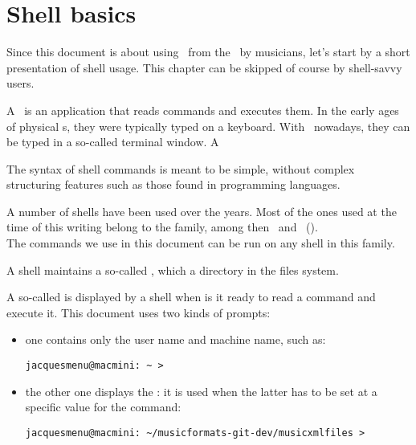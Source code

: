 
\chapter{Shell basics}

Since this document is about using \mf\ from the \CLI\ by musicians, let's start by a short presentation of shell usage. This chapter can be skipped of course by shell-savvy users.

A \shell\ is an application that reads commands and executes them. In the early ages of physical s, they were typically typed on a keyboard. With \GUI\ nowadays, they can be typed in a so-called terminal window.
A 

The syntax of shell commands is meant to be simple, without complex structuring features such as those found in programming languages.

A number of shells have been used over the years. Most of the ones used at the time of this writing belong to the  family, among then \bash\ and \zsh\ (). \\
The commands we use in this document can be run on any shell in this family.

A shell maintains a so-called {\it \currentWorkingDirectory}, which a directory in the files system.

A so-called  is displayed by a shell when is it ready to read a command and execute it. This document uses two kinds of prompts:
\begin{itemize}
\item one contains only the user name and machine name, such as:
\begin{lstlisting}[language=Terminal]
jacquesmenu@macmini: ~ > 
\end{lstlisting}

\item the other one displays the \currentWorkingDirectory: it is used when the latter has to be set at a specific value for the command:
\begin{lstlisting}[language=Terminal]
jacquesmenu@macmini: ~/musicformats-git-dev/musicxmlfiles > 
\end{lstlisting}

\end{itemize}


